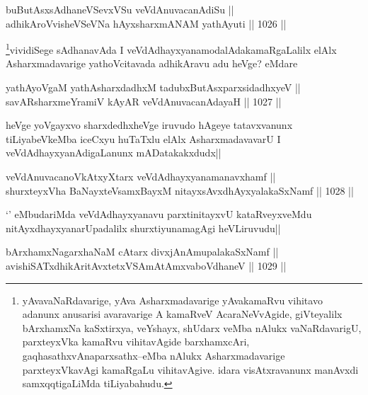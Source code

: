 
\begin{shl}
buButAsxsAdhaneVSevxVSu veVdAnuvacanAdiSu || \\
adhikAroV\s visheVSeVNa hAyxsharxmANAM yathAyuti ||  1026 ||  
\end{shl}

\begin{artha}
\footnote{yAvavaNaRdavarige, yAva Asharxmadavarige yAvakamaRvu vihitavo adanunx anusarisi avaravarige A kamaRveV AcaraNeVvAgide, giVteyalilx bArxhamxNa kaSxtirxya, veYshayx, shUdarx veMba nAlukx vaNaRdavarigU, parxteyxVka kamaRvu vihitavAgide barxhamxcAri, gaqhasathxvAnaparxsathx--eMba nAlukx Asharxmadavarige parxteyxVkavAgi kamaRgaLu vihitavAgive. idara visAtxravanunx manAvxdi samxqqtigaLiMda tiLiyabahudu.}vividiSege sAdhanavAda I veVdAdhayxyanamodalAdakamaRgaLalilx elAlx Asharxmadavarige yathoVcitavada adhikAravu adu heVge? eMdare
\end{artha}

\begin{shl}
yathAyoVgaM yathAsharxdadhxM tadubxButAsxparxsidadhxyeV || \\
savARsharxmeYramiV kAyAR veVdAnuvacanAdayaH ||  1027 ||  
\end{shl}

\begin{artha}
heVge yoVgayxvo sharxdedhxheVge iruvudo hAgeye tatavxvanunx tiLiyabeVkeMba iceCxyu huTaTxlu elAlx AsharxmadavavarU I veVdAdhayxyanAdigaLanunx mADatakakxdudx||
\end{artha}


\begin{shl}
veVdAnuvacanoVkAtxyX\s tarx veVdAdhayxyanamanavxhamf || \\
shurxteyxVha BaNayxteV\s samxBayxM nitayxsAvxdhAyxyalakaSxNamf ||  1028 ||  
\end{shl}

\begin{artha}
`\stext' eMbudariMda veVdAdhayxyanavu parxtinitayxvU kataRveyxveMdu nitAyxdhayxyanarUpadalilx shurxtiyunamagAgi heVLiruvudu||
\end{artha}


\begin{shl}
bArxhamxNagarxhaNaM cAtarx divxjAnAmupalakaSxNamf || \\
avishiSATxdhikAritAvxtetxVSAmAtAmxvaboVdhaneV ||  1029 ||  
\end{shl}

